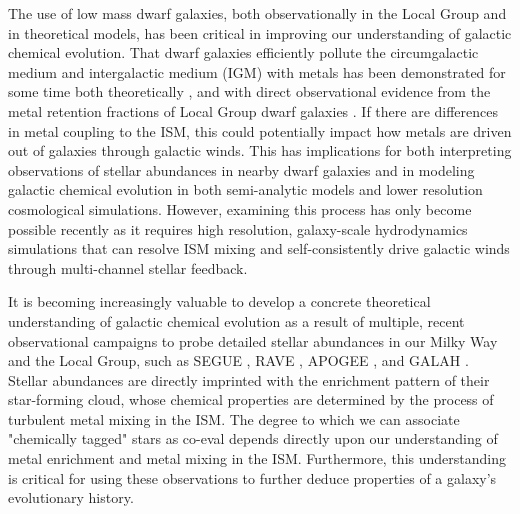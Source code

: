 The use of low mass dwarf galaxies, both observationally in the Local Group and in theoretical models, has been critical in improving our understanding of galactic chemical evolution. That dwarf galaxies efficiently pollute the circumgalactic medium and intergalactic medium (IGM) with metals has been demonstrated for some time both theoretically \citep[e.g.][]{DekelSilk1986,MacLowFerrara1999,Fragile2004,Muratov2017,Corlies2018}, and with direct observational evidence from the metal retention fractions of Local Group dwarf galaxies \citep[e.g.][]{Kirby2011-metals,Bordoloi2014,McQuinn2015}. If there are differences in metal coupling to the ISM, this could potentially impact how metals are driven out of galaxies through galactic winds. This has implications for both interpreting observations of stellar abundances in nearby dwarf galaxies and in modeling galactic chemical evolution in both semi-analytic models and lower resolution cosmological simulations. However, examining this process has only become possible recently as it requires high resolution, galaxy-scale hydrodynamics simulations that can resolve ISM mixing and self-consistently drive galactic winds through multi-channel stellar feedback.

It is becoming increasingly valuable to develop a concrete theoretical understanding of galactic chemical evolution as a result of multiple, recent observational campaigns to probe detailed stellar abundances in our Milky Way and the Local Group, such as SEGUE \citep{Yanny2009}, RAVE \citep{Kunder2017}, APOGEE \citep{Anders2014}, and GALAH \citep{Buder2018}. Stellar abundances are directly imprinted with the enrichment pattern of their star-forming cloud, whose chemical properties are determined by the process of turbulent metal mixing in the ISM. The degree to which we can associate "chemically tagged" stars as co-eval depends directly upon our understanding of metal enrichment and metal mixing in the ISM. Furthermore, this understanding is critical for using these observations to further deduce properties of a galaxy's evolutionary history.

